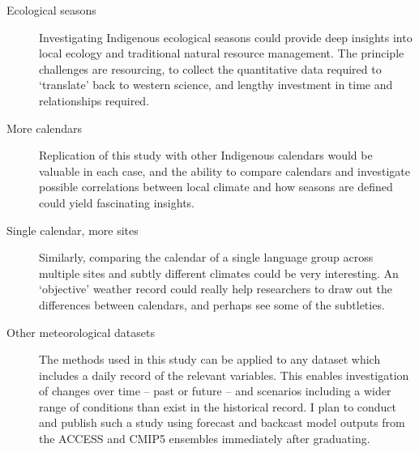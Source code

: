 \begin{description}
\item[Ecological seasons]
        Investigating Indigenous ecological seasons could provide deep insights
        into local ecology and traditional natural resource management.
        The principle challenges are resourcing, to collect the quantitative
        data required to `translate' back to western science, and lengthy
        investment in time and relationships required.

\item [More calendars]
        Replication of this study with other Indigenous calendars would be
        valuable in each case, and the ability to compare calendars and investigate
        possible correlations between local climate and how seasons are
        defined could yield fascinating insights.

\item [Single calendar, more sites]
        Similarly, comparing the calendar of a single language group across
        multiple sites and subtly different climates could be very interesting.
        An `objective' weather record could really help researchers to draw out
        the differences between calendars, and perhaps see some of the subtleties.

\item [Other meteorological datasets]
        The methods used in this study can be applied to any dataset which
        includes a daily record of the relevant variables.  This enables
        investigation of changes over time -- past or future -- and scenarios
        including a wider range of conditions than exist in the historical record.
        I plan to conduct and publish such a study using forecast and backcast
        model outputs from the ACCESS and CMIP5 ensembles immediately
        after graduating.

\item []


\end{description}



